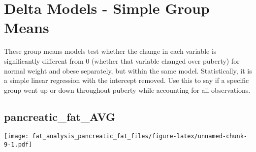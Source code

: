 \documentclass[
]{article}
\begin{document}
\hypertarget{delta-models---simple-group-means}{%
\section{Delta Models - Simple Group
Means}\label{delta-models---simple-group-means}}

These group means models test whether the change in each variable is
significantly different from 0 (whether that variable changed over
puberty) for normal weight and obese separately, but within the same
model. Statistically, it is a simple linear regression with the
intercept removed. Use this to say if a specific group went up or down
throughout puberty while accounting for all observations.

\newpage

\hypertarget{pancreatic_fat_avg-1}{%
\subsection{pancreatic\_fat\_AVG}\label{pancreatic_fat_avg-1}}

\texttt{[image: fat\_analysis\_pancreatic\_fat\_files/figure-latex/unnamed-chunk-9-1.pdf]}
\end{document}
